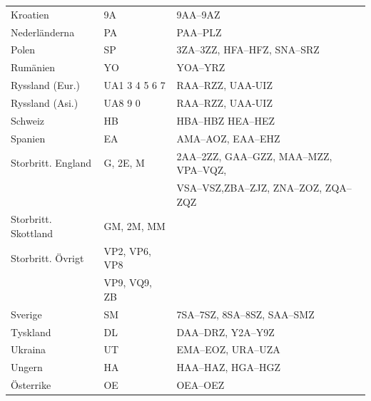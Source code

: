 \begin{center}
\begin{footnotesize}
\begin{longtable}{lll}
			Kroatien                      & 9A             & 9AA--9AZ                                          \\
			Nederländerna                 & PA             & PAA--PLZ                                          \\
			Polen                         & SP             & 3ZA--3ZZ, HFA--HFZ, SNA--SRZ                      \\
			Rumänien                      & YO             & YOA--YRZ                                          \\
			Ryssland (Eur.)               & UA1 3 4 5 6 7  & RAA--RZZ, UAA-UIZ                                 \\
			Ryssland (Asi.)               & UA8 9 0        & RAA--RZZ, UAA-UIZ                                 \\
			Schweiz                       & HB             & HBA--HBZ HEA--HEZ                                 \\
			Spanien                       & EA             & AMA--AOZ, EAA--EHZ                                \\
			Storbritt. England            & G, 2E, M       & 2AA--2ZZ, GAA--GZZ, MAA--MZZ, VPA--VQZ,           \\
			                              &                & VSA--VSZ,ZBA--ZJZ, ZNA--ZOZ, ZQA--ZQZ             \\
			Storbritt. Skottland          & GM, 2M, MM     &                                                   \\
			Storbritt. Övrigt             & VP2, VP6, VP8  &                                                   \\
			                              & VP9, VQ9, ZB   &                                                   \\
			Sverige                       & SM             & 7SA--7SZ, 8SA--8SZ, SAA--SMZ                      \\
			Tyskland                      & DL             & DAA--DRZ, Y2A--Y9Z                                \\
			Ukraina                       & UT             & EMA--EOZ, URA--UZA                                \\
			Ungern                        & HA             & HAA--HAZ, HGA--HGZ                                \\
			Österrike                     & OE             & OEA--OEZ\\
		\end{longtable}
	\end{footnotesize}
\end{center}

